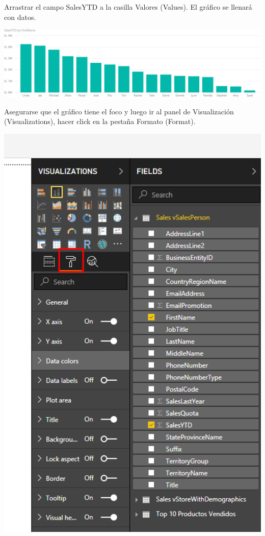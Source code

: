 \documentclass[12pt,letterpaper]{article}
\begin{document}
Arrastrar el campo SalesYTD a la casilla Valores (Values). El gráfico se llenará con datos.
\begin{center}
    \includegraphics[width=16cm]{img/21.png}  
\end{center}
Asegurarse que el gráfico tiene el foco y luego ir al panel de Visualización (Visualizations), hacer click en la pestaña Formato (Format).
\begin{center}
    \includegraphics[width=16cm]{img/22.png}  
\end{center}
\end{document}
